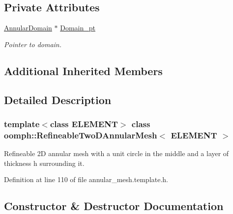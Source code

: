 \subsection*{Private Attributes}
\begin{DoxyCompactItemize}
\item 
\hyperlink{classoomph_1_1AnnularDomain}{Annular\+Domain} $\ast$ \hyperlink{classoomph_1_1RefineableTwoDAnnularMesh_abcf8125abca9f4e5659f03ceffcb9584}{Domain\+\_\+pt}
\begin{DoxyCompactList}\small\item\em Pointer to domain. \end{DoxyCompactList}\end{DoxyCompactItemize}
\subsection*{Additional Inherited Members}


\subsection{Detailed Description}
\subsubsection*{template$<$class E\+L\+E\+M\+E\+NT$>$\newline
class oomph\+::\+Refineable\+Two\+D\+Annular\+Mesh$<$ E\+L\+E\+M\+E\+N\+T $>$}

Refineable 2D annular mesh with a unit circle in the middle and a layer of thickness h surrounding it. 

Definition at line 110 of file annular\+\_\+mesh.\+template.\+h.



\subsection{Constructor \& Destructor Documentation}
\mbox{\label{classoomph_1_1RefineableTwoDAnnularMesh_ae2ade4a5af04871f53de1906a428d6ff}} 
